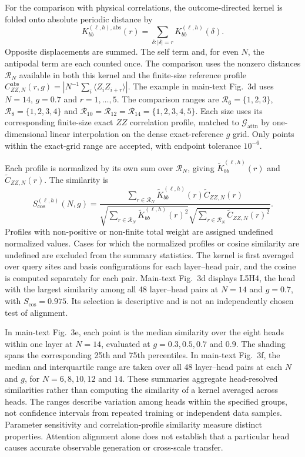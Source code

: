 \documentclass[11pt,a4paper]{article}
\begin{document}
For the comparison with physical correlations, the outcome-directed
kernel is folded onto absolute periodic distance by
\begin{equation}
K^{(\ell,h),\mathrm{abs}}_{bb}(r)
=\sum_{\delta:|\delta|=r}K^{(\ell,h)}_{bb}(\delta).
\label{supp:eq:kernel_fold}
\end{equation}
Opposite displacements are summed. The self term and, for even $N$, the
antipodal term are each counted once. The comparison uses the nonzero
distances $\mathcal{R}_{N}$ available in both this kernel and the
finite-size reference profile
$C_{ZZ,N}^{\mathrm{abs}}(r,g)=|N^{-1}\sum_i\langle Z_iZ_{i+r}\rangle|$.
The example in main-text Fig.~3d uses $N=14$, $g=0.7$ and $r=1,\ldots,5$.
The comparison ranges are $\mathcal{R}_6=\{1,2,3\}$,
$\mathcal{R}_8=\{1,2,3,4\}$ and
$\mathcal{R}_{10}=\mathcal{R}_{12}=\mathcal{R}_{14}=\{1,2,3,4,5\}$.
Each size uses its corresponding finite-size exact $ZZ$ correlation
profile, matched to $\mathcal{G}_{\mathrm{attn}}$ by one-dimensional
linear interpolation on the dense exact-reference $g$ grid. Only points
within the exact-grid range are accepted, with endpoint tolerance $10^{-6}$.

Each profile is normalized by its own sum over $\mathcal{R}_{N}$,
giving $\widetilde{K}^{(\ell,h)}_{bb}(r)$ and
$\widetilde{C}_{ZZ,N}(r)$. The similarity is
\begin{equation}
S^{(\ell,h)}_{\mathrm{cos}}(N,g)=
\frac{\sum_{r\in\mathcal{R}_{N}}
\widetilde{K}^{(\ell,h)}_{bb}(r)\widetilde{C}_{ZZ,N}(r)}
{\sqrt{\sum_{r\in\mathcal{R}_{N}}\widetilde{K}^{(\ell,h)}_{bb}(r)^2}
\sqrt{\sum_{r\in\mathcal{R}_{N}}\widetilde{C}_{ZZ,N}(r)^2}}.
\label{supp:eq:attention_cosine}
\end{equation}
Profiles with non-positive or non-finite total weight are assigned
undefined normalized values. Cases for which the normalized profiles or cosine similarity are undefined are excluded from the summary statistics.
The kernel is first averaged over query sites and basis configurations
for each layer--head pair, and the cosine is computed separately for
each pair. Main-text Fig.~3d displays L5H4, the head with the largest
similarity among all 48 layer--head pairs at $N=14$ and $g=0.7$, with
$S_{\mathrm{cos}}=0.975$. Its selection is descriptive and is not an
independently chosen test of alignment.

In main-text Fig.~3e, each point is the median similarity over the eight
heads within one layer at $N=14$, evaluated at $g=0.3,0.5,0.7$ and $0.9$.
The shading spans the corresponding 25th and 75th percentiles. In
main-text Fig.~3f, the median and interquartile range are taken over all
48 layer--head pairs at each $N$ and $g$, for $N=6,8,10,12$ and $14$.
These summaries aggregate head-resolved similarities rather than
computing the similarity of a kernel averaged across heads. The ranges
describe variation among heads within the specified groups, not
confidence intervals from repeated training or independent data samples.
Parameter sensitivity and correlation-profile similarity measure
distinct properties. Attention alignment alone does not establish that
a particular head causes accurate observable generation or cross-scale
transfer.
\end{document}
